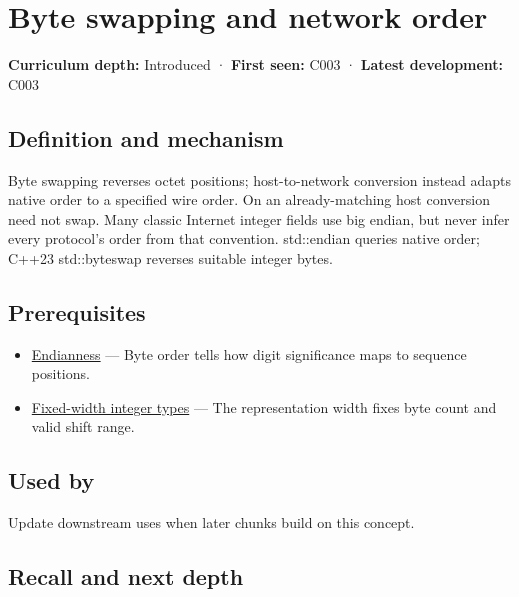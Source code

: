 \hypertarget{appendix-11ba36693aa2}{}
\section{Byte swapping and network order}\label{appendix-11ba36693aa2-byte-swapping-and-network-order}

\textbf{Curriculum depth:} Introduced · \textbf{First seen:} C003 · \textbf{Latest development:} C003

\subsection{Definition and mechanism}\label{appendix-11ba36693aa2-definition-and-mechanism}

Byte swapping reverses octet positions; host-to-network conversion instead adapts native order to a specified wire order. On an already-matching host conversion need not swap. Many classic Internet integer fields use big endian, but never infer every protocol's order from that convention. std::endian queries native order; C++23 std::byteswap reverses suitable integer bytes.

\subsection{Prerequisites}\label{appendix-11ba36693aa2-prerequisites}

\begin{itemize}
\tightlist
\item
  \hyperref[appendix-bc07c3d25b18]{Endianness} --- Byte order tells how digit significance maps to sequence positions.
\item
  \hyperref[appendix-cc04044b5782]{Fixed-width integer types} --- The representation width fixes byte count and valid shift range.
\end{itemize}

\subsection{Used by}\label{appendix-11ba36693aa2-used-by}

Update downstream uses when later chunks build on this concept.

\subsection{Recall and next depth}\label{appendix-11ba36693aa2-recall-and-next-depth}


